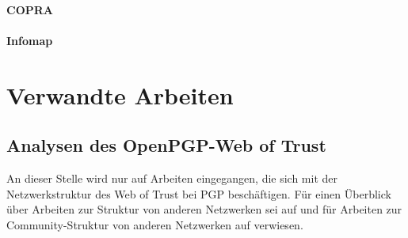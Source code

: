 \paragraph{COPRA}
\label{sec:copra}

\paragraph{Infomap}
\label{sec:infomap}

\section{Verwandte Arbeiten}
\label{ch:Grundlagen:sec:RelatedWork}

\subsection{Analysen des OpenPGP-Web of Trust}
\label{ch:Grundlagen:sec:RelatedWork:subsec:wot-analysis}

An dieser Stelle wird nur auf Arbeiten eingegangen, die sich mit der
Netzwerkstruktur des Web of Trust bei PGP besch\"aftigen. F\"ur einen
\"Uberblick \"uber Arbeiten zur Struktur von anderen Netzwerken sei
auf \cite{newman:167}und f\"ur Arbeiten zur Community-Struktur von
anderen Netzwerken auf \cite{Fortunato2010} verwiesen.
